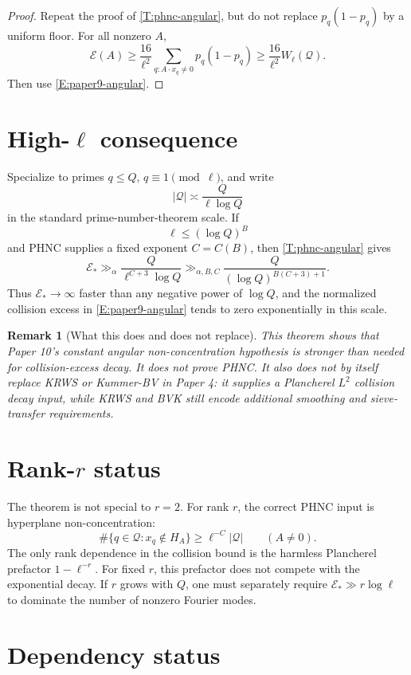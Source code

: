 \documentclass[11pt]{article}
\newtheorem{remark}{Remark}
\newcommand{\E}{\mathcal E}
\begin{document}
\begin{proof}
Repeat the proof of \cref{T:phnc-angular}, but do not replace \(p_q(1-p_q)\) by a uniform floor.  For all nonzero \(A\),
\[
\E(A)\ge
\frac{16}{\ell^2}
\sum_{q:A\cdot x_q\ne0}p_q(1-p_q)
\ge
\frac{16}{\ell^2}W_\ell(\mathcal Q).
\]
Then use \eqref{E:paper9-angular}.
\end{proof}

\section{High-\texorpdfstring{\(\ell\)}{ell} consequence}

Specialize to primes \(q\le Q\), \(q\equiv1\pmod\ell\), and write
\[
|\mathcal Q|\asymp \frac{Q}{\ell\log Q}
\]
in the standard prime-number-theorem scale.  If
\[
\ell\le(\log Q)^B
\]
and PHNC supplies a fixed exponent \(C=C(B)\), then \cref{T:phnc-angular} gives
\[
\E_*
\gg_\alpha
\frac{Q}{\ell^{C+3}\log Q}
\gg_{\alpha,B,C}
\frac{Q}{(\log Q)^{B(C+3)+1}}.
\]
Thus \(\E_*\to\infty\) faster than any negative power of \(\log Q\), and the normalized collision excess in \eqref{E:paper9-angular} tends to zero exponentially in this scale.

\begin{remark}[What this does and does not replace]
This theorem shows that Paper 10's constant angular non-concentration hypothesis is stronger than needed for collision-excess decay.  It does not prove PHNC.  It also does not by itself replace KRWS or Kummer-BV in Paper 4: it supplies a Plancherel \(L^2\) collision decay input, while KRWS and BVK still encode additional smoothing and sieve-transfer requirements.
\end{remark}

\section{Rank-\texorpdfstring{\(r\)}{r} status}

The theorem is not special to \(r=2\).  For rank \(r\), the correct PHNC input is hyperplane non-concentration:
\[
\#\{q\in\mathcal Q:x_q\notin H_A\}
\ge
\ell^{-C}|\mathcal Q|
\qquad(A\ne0).
\]
The only rank dependence in the collision bound is the harmless Plancherel prefactor \(1-\ell^{-r}\).  For fixed \(r\), this prefactor does not compete with the exponential decay.  If \(r\) grows with \(Q\), one must separately require \(\E_*\gg r\log\ell\) to dominate the number of nonzero Fourier modes.

\section{Dependency status}
\end{document}
